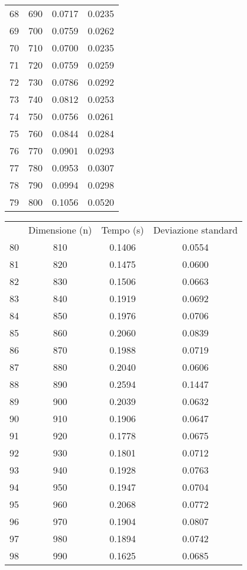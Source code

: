 \begin{table}
\begin{adjustbox}{width=1\textwidth/2}
\begin{tabular}{|c|c|c|c|}
68 & 690 & 0.0717 & 0.0235 \\
\cline{1-4}
69 & 700 & 0.0759 & 0.0262 \\
\cline{1-4}
70 & 710 & 0.0700 & 0.0235 \\
\cline{1-4}
71 & 720 & 0.0759 & 0.0259 \\
\cline{1-4}
72 & 730 & 0.0786 & 0.0292 \\
\cline{1-4}
73 & 740 & 0.0812 & 0.0253 \\
\cline{1-4}
74 & 750 & 0.0756 & 0.0261 \\
\cline{1-4}
75 & 760 & 0.0844 & 0.0284 \\
\cline{1-4}
76 & 770 & 0.0901 & 0.0293 \\
\cline{1-4}
77 & 780 & 0.0953 & 0.0307 \\
\cline{1-4}
78 & 790 & 0.0994 & 0.0298 \\
\cline{1-4}
79 & 800 & 0.1056 & 0.0520 \\
\cline{1-4}
\end{tabular}
\end{adjustbox}
\end{table}

\begin{table}
\centering
\begin{adjustbox}{width=1\textwidth/2}
\begin{tabular}{|c|c|c|c|}
\hline
 & Dimensione (n) & Tempo (s) & Deviazione standard \\
80 & 810 & 0.1406 & 0.0554 \\
\cline{1-4}
81 & 820 & 0.1475 & 0.0600 \\
\cline{1-4}
82 & 830 & 0.1506 & 0.0663 \\
\cline{1-4}
83 & 840 & 0.1919 & 0.0692 \\
\cline{1-4}
84 & 850 & 0.1976 & 0.0706 \\
\cline{1-4}
85 & 860 & 0.2060 & 0.0839 \\
\cline{1-4}
86 & 870 & 0.1988 & 0.0719 \\
\cline{1-4}
87 & 880 & 0.2040 & 0.0606 \\
\cline{1-4}
88 & 890 & 0.2594 & 0.1447 \\
\cline{1-4}
89 & 900 & 0.2039 & 0.0632 \\
\cline{1-4}
90 & 910 & 0.1906 & 0.0647 \\
\cline{1-4}
91 & 920 & 0.1778 & 0.0675 \\
\cline{1-4}
92 & 930 & 0.1801 & 0.0712 \\
\cline{1-4}
93 & 940 & 0.1928 & 0.0763 \\
\cline{1-4}
94 & 950 & 0.1947 & 0.0704 \\
\cline{1-4}
95 & 960 & 0.2068 & 0.0772 \\
\cline{1-4}
96 & 970 & 0.1904 & 0.0807 \\
\cline{1-4}
97 & 980 & 0.1894 & 0.0742 \\
\cline{1-4}
98 & 990 & 0.1625 & 0.0685 \\
\cline{1-4}
\end{tabular}
\end{adjustbox}
\end{table}

